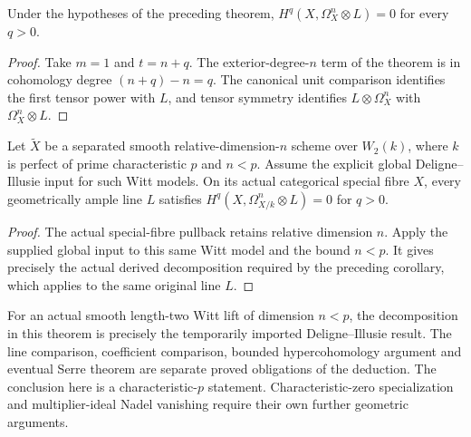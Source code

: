 \begin{corollary}
\label{cor:kn-kodaira-from-di}
\leanok
Under the hypotheses of the preceding theorem,
$H^q(X,\Omega_X^n\otimes L)=0$ for every $q>0$.
\end{corollary}
\begin{proof}
Take $m=1$ and $t=n+q$.  The exterior-degree-$n$ term of the
theorem is in cohomology degree $(n+q)-n=q$.  The canonical unit
comparison identifies the first tensor power with $L$, and tensor
symmetry identifies $L\otimes\Omega_X^n$ with
$\Omega_X^n\otimes L$.
\end{proof}

\begin{corollary}
\label{cor:kn-kodaira-witt-lift}
\leanok
Let $\widetilde X$ be a separated smooth relative-dimension-$n$ scheme
over $W_2(k)$, where $k$ is perfect of prime characteristic $p$ and $n<p$.
Assume the explicit global Deligne--Illusie input for such Witt models.
On its actual categorical special fibre $X$, every geometrically ample
line $L$ satisfies $H^q(X,\Omega^n_{X/k}\otimes L)=0$ for $q>0$.
\end{corollary}
\begin{proof}
The actual special-fibre pullback retains relative dimension $n$.
Apply the supplied global input to this same Witt model and the bound
$n<p$.  It gives precisely the actual derived decomposition required by
the preceding corollary, which applies to the same original line $L$.
\end{proof}

\begin{remark}
\label{rmk:kn-positive-hodge-witt-boundary}
For an actual smooth length-two Witt lift of dimension $n<p$, the
decomposition in this theorem is precisely the temporarily imported
Deligne--Illusie result.  The line comparison, coefficient comparison,
bounded hypercohomology argument and eventual Serre theorem are
separate proved obligations of the deduction.  The conclusion here is
a characteristic-$p$ statement.  Characteristic-zero specialization
and multiplier-ideal Nadel vanishing require their own further
geometric arguments.
\end{remark}
